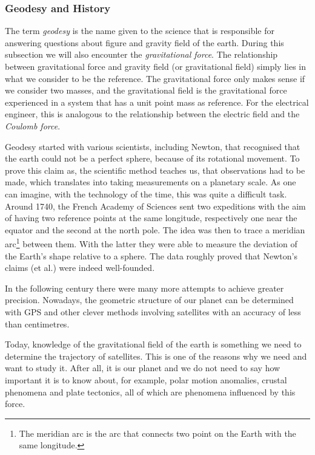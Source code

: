 \subsubsection{Geodesy and History}

The term \emph{geodesy} is the name given to the science that is responsible for
answering questions about figure and gravity field of the earth. During this
subsection we will also encounter the \emph{gravitational force}. The relationship
between gravitational force and gravity field (or gravitational field) simply
lies in what we consider to be the reference. The gravitational force only makes
sense if we consider two masses, and the gravitational field is the
gravitational force experienced in a system that has a unit point mass as
reference. For the electrical engineer, this is analogous to the relationship
between the electric field and the \emph{Coulomb force}.

Geodesy started with various scientists, including Newton, that
recognised that the earth could not be a perfect sphere, because of its
rotational movement. To prove this claim as, the scientific method teaches us,
that observations had to be made, which translates into taking measurements on a
planetary scale. As one can imagine, with the technology of the time, this was
quite a difficult task. Around 1740, the French Academy of Sciences sent two
expeditions with the aim of having two reference points at the same longitude, 
respectively one near the equator and the second at the north pole. 
The idea was then to trace a meridian arc\footnote{The meridian arc is 
the arc that connects two point on the Earth with the same longitude.}
between them. With the latter they were able to measure the deviation 
of the Earth's shape relative to a sphere. The data roughly proved that 
Newton's claims (et al.) were indeed well-founded. 

In the following century there were many more attempts to achieve greater precision. 
Nowadays, the geometric structure of our planet can be determined with GPS and other
clever methods involving satellites with an accuracy of less than centimetres.

Today, knowledge of the gravitational field of the earth is something we need to
determine the trajectory of satellites. This is one of the reasons why we need
and want to study it.  After all, it is our planet and we do not need to say how
important it is to know about, for example, polar motion anomalies, crustal
phenomena and plate tectonics, all of which are phenomena influenced by this
force.


